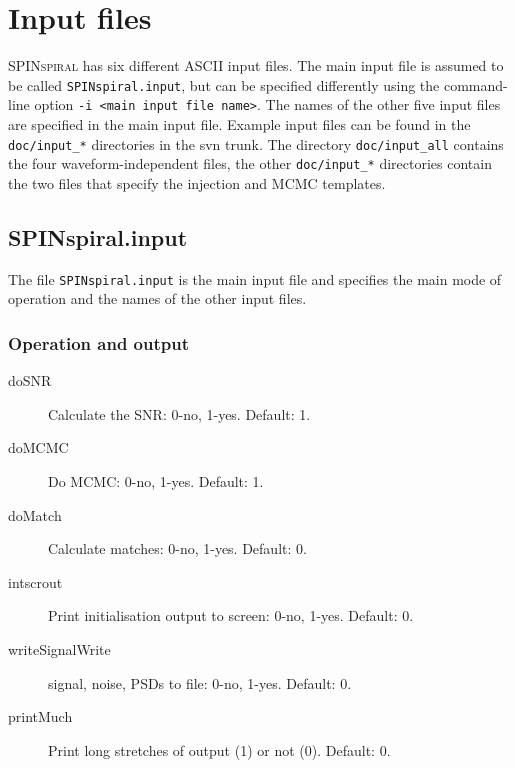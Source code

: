 \begin{description}
  
\end{description}
  
  















\pagebreak
\section{Input files}
\label{sec:input_files}

\textsc{SPINspiral} has six different ASCII input files.  The main input file is assumed to be called
\texttt{SPINspiral.input}, but can be specified differently using the command-line option \texttt{-i 
  <main input file name>}.  The names of the other five input files are specified in the main
input file.  Example input files can be found in the \texttt{doc/input\_*} directories in the svn
trunk.  The directory \texttt{doc/input\_all} contains the four waveform-independent files, the
other \texttt{doc/input\_*} directories contain the two files that specify the injection and MCMC
templates.


\subsection{SPINspiral.input}
\label{sec:SPINspiral.input}

The file \texttt{SPINspiral.input} is the main input file and specifies the main mode of operation 
and the names of the other input files.

\subsubsection{Operation and output}
\begin{description}
\item[doSNR] Calculate the SNR: 0-no, 1-yes. Default: 1.
\item[doMCMC] Do MCMC: 0-no, 1-yes.  Default: 1.
\item[doMatch] Calculate matches: 0-no, 1-yes.  Default: 0.
\item[intscrout]  Print initialisation output to screen: 0-no, 1-yes.  Default: 0.
\item[writeSignalWrite] signal, noise, PSDs to file: 0-no, 1-yes.  Default: 0.
\item[printMuch]  Print long stretches of output (1) or not (0).  Default: 0.
\end{description}


